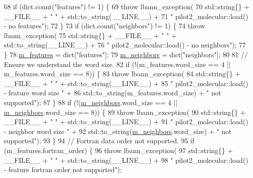 \begin{DoxyCode}
68     \textcolor{keywordflow}{if} (dict.count(\textcolor{stringliteral}{"features"}) != 1) \{
69       \textcolor{keywordflow}{throw} lbann\_exception(
70         std::string\{\} + \_\_FILE\_\_ + \textcolor{stringliteral}{" "} + std::to\_string(\_\_LINE\_\_) +
71         \textcolor{stringliteral}{" pilot2\_molecular::load() - no features"});
72     \}
73     \textcolor{keywordflow}{if} (dict.count(\textcolor{stringliteral}{"neighbors"}) != 1) \{
74       \textcolor{keywordflow}{throw} lbann\_exception(
75         std::string\{\} + \_\_FILE\_\_ + \textcolor{stringliteral}{" "} + std::to\_string(\_\_LINE\_\_) +
76         \textcolor{stringliteral}{" pilot2\_molecular::load() - no neighbors"});
77     \}
78     \hyperlink{classlbann_1_1pilot2__molecular__reader_a6b273890ecd01754e21be87da68b57bc}{m\_features} = dict[\textcolor{stringliteral}{"features"}];
79     \hyperlink{classlbann_1_1pilot2__molecular__reader_a0d8dc24b8ea66352a4d45a157b3a3c04}{m\_neighbors} = dict[\textcolor{stringliteral}{"neighbors"}];
80 
81     \textcolor{comment}{// Ensure we understand the word size.}
82     \textcolor{keywordflow}{if} (!(m\_features.word\_size == 4 || m\_features.word\_size == 8)) \{
83       \textcolor{keywordflow}{throw} lbann\_exception(
84         std::string\{\} + \_\_FILE\_\_ + \textcolor{stringliteral}{" "} + std::to\_string(\_\_LINE\_\_) +
85         \textcolor{stringliteral}{" pilot2\_molecular::load() - feature word size "} +
86         std::to\_string(m\_features.word\_size) + \textcolor{stringliteral}{" not supported"});
87     \}
88     \textcolor{keywordflow}{if} (!(\hyperlink{classlbann_1_1pilot2__molecular__reader_a0d8dc24b8ea66352a4d45a157b3a3c04}{m\_neighbors}.word\_size == 4 || \hyperlink{classlbann_1_1pilot2__molecular__reader_a0d8dc24b8ea66352a4d45a157b3a3c04}{m\_neighbors}.word\_size == 8)) \{
89       \textcolor{keywordflow}{throw} lbann\_exception(
90         std::string\{\} + \_\_FILE\_\_ + \textcolor{stringliteral}{" "} + std::to\_string(\_\_LINE\_\_) +
91         \textcolor{stringliteral}{" pilot2\_molecular::load() - neighbor word size "} +
92         std::to\_string(\hyperlink{classlbann_1_1pilot2__molecular__reader_a0d8dc24b8ea66352a4d45a157b3a3c04}{m\_neighbors}.word\_size) + \textcolor{stringliteral}{" not supported"});
93     \}
94     \textcolor{comment}{// Fortran data order not supported.}
95     \textcolor{keywordflow}{if} (m\_features.fortran\_order) \{
96       \textcolor{keywordflow}{throw} lbann\_exception(
97         std::string\{\} + \_\_FILE\_\_ + \textcolor{stringliteral}{" "} + std::to\_string(\_\_LINE\_\_) +
98         \textcolor{stringliteral}{" pilot2\_molecular::load() - feature fortran order not supported"});

\end{DoxyCode}
